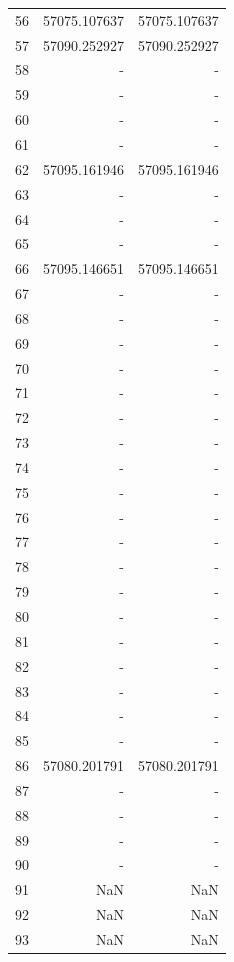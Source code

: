\begin{appendix}
\begin{table}[h!]
\begin{tabular}{|l|r|r|}
56& 57075.107637   & 57075.107637   \\
57& 57090.252927   & 57090.252927   \\
58& -              & -              \\
59& -              & -              \\
60& -              & -              \\
61& -              & -              \\
62& 57095.161946   & 57095.161946   \\
63& -              & -              \\
64& -              & -              \\
65& -              & -              \\
66& 57095.146651   & 57095.146651   \\
67& -              & -              \\
68& -              & -              \\
69& -              & -              \\
70& -              & -              \\
71& -              & -              \\
72& -              & -              \\
73& -              & -              \\
74& -              & -              \\
75& -              & -              \\
76& -              & -              \\
77& -              & -              \\
78& -              & -              \\
79& -              & -              \\
80& -              & -              \\
81& -              & -              \\
82& -              & -              \\
83& -              & -              \\
84& -              & -              \\
85& -              & -              \\
86& 57080.201791   & 57080.201791   \\
87& -              & -              \\
88& -              & -              \\
89& -              & -              \\
90& -              & -              \\
91& NaN            & NaN            \\
92& NaN            & NaN            \\
93& NaN            & NaN           \\\hline
\end{tabular}
\label{ap:tab2}
\end{table}
\pagebreak

\end{appendix}
